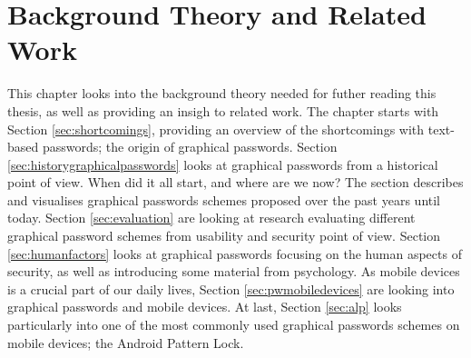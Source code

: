\chapter{Background Theory and Related Work}\label{chap:relatedwork}
  
  This chapter looks into the background theory needed for futher reading this thesis, as well as providing an insigh to related work.  
  The chapter starts with Section \ref{sec:shortcomings}, providing an overview of the shortcomings with text-based passwords; the origin of graphical passwords. Section \ref{sec:historygraphicalpasswords} looks at graphical passwords from a historical point of view. When did it all start, and where are we now? The section describes and visualises graphical passwords schemes proposed over the past years until today. Section \ref{sec:evaluation} are looking at research evaluating different graphical password schemes from usability and security point of view. Section \ref{sec:humanfactors} looks at graphical passwords focusing on the human aspects of security, as well as introducing some material from psychology. As mobile devices is a crucial part of our daily lives, Section \ref{sec:pwmobiledevices} are looking into graphical passwords and mobile devices. At last, Section \ref{sec:alp} looks particularly into one of the most commonly used graphical passwords schemes on mobile devices; the Android Pattern Lock.